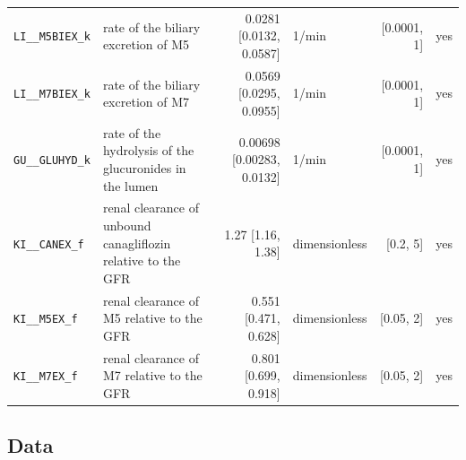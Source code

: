 \documentclass{article}
\begin{document}
\begin{longtable}{llrlrl}
\texttt{LI\_\_M5BIEX\_k} & rate of the biliary excretion of M5 & 0.0281 [0.0132, 0.0587] & 1/min & [0.0001, 1] & yes \\
\texttt{LI\_\_M7BIEX\_k} & rate of the biliary excretion of M7 & 0.0569 [0.0295, 0.0955] & 1/min & [0.0001, 1] & yes \\
\texttt{GU\_\_GLUHYD\_k} & rate of the hydrolysis of the glucuronides in the lumen & 0.00698 [0.00283, 0.0132] & 1/min & [0.0001, 1] & yes \\
\texttt{KI\_\_CANEX\_f} & renal clearance of unbound canagliflozin relative to the GFR & 1.27 [1.16, 1.38] & dimensionless & [0.2, 5] & yes \\
\texttt{KI\_\_M5EX\_f} & renal clearance of M5 relative to the GFR & 0.551 [0.471, 0.628] & dimensionless & [0.05, 2] & yes \\
\texttt{KI\_\_M7EX\_f} & renal clearance of M7 relative to the GFR & 0.801 [0.699, 0.918] & dimensionless & [0.05, 2] & yes \\
\end{longtable}

\subsection{Data}
\end{document}
